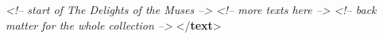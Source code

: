 \begin{shaded}
\hspace*{1em}\mbox{}\newline 
\hspace*{1em}\mbox{}\newline 
\textit{<!-- start of The Delights of the Muses -->}\mbox{}\newline 
\hspace*{1em}\hspace*{1em}\mbox{}\newline 
\hspace*{1em}\hspace*{1em}\hspace*{1em}\mbox{}\newline 
\hspace*{1em}\hspace*{1em}\hspace*{1em}\mbox{}\newline 
\textit{<!-- more texts here -->}\mbox{}\newline 
\hspace*{1em}\hspace*{1em}\mbox{}\newline 
\hspace*{1em}\mbox{}\newline 
{}\mbox{}\newline 
{}\mbox{}\newline 
\textit{<!-- back matter for the whole collection -->}\mbox{}\newline 
{}\mbox{}\newline 
{</\textbf{text}>}\end{shaded}\egroup\par \par
